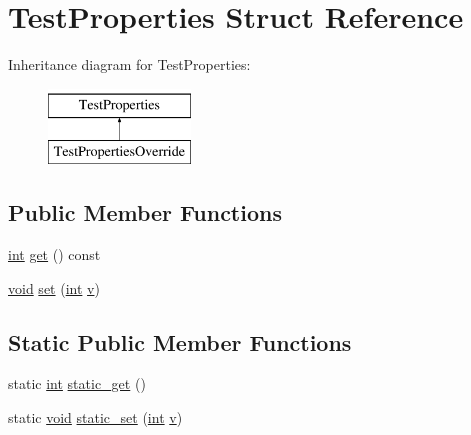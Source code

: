\hypertarget{struct_test_properties}{}\section{Test\+Properties Struct Reference}
\label{struct_test_properties}
Inheritance diagram for Test\+Properties\+:\begin{figure}[H]
\begin{center}
\leavevmode
\includegraphics[height=2.000000cm]{struct_test_properties}
\end{center}
\end{figure}
\subsection*{Public Member Functions}
\begin{DoxyCompactItemize}
\item 
\mbox{\hyperlink{warnings_8h_a74f207b5aa4ba51c3a2ad59b219a423b}{int}} \mbox{\hyperlink{struct_test_properties_aacc5c9e0b4d5e4d09e9fefcf07c36db9}{get}} () const
\item 
\mbox{\hyperlink{_s_d_l__opengles2__gl2ext_8h_ae5d8fa23ad07c48bb609509eae494c95}{void}} \mbox{\hyperlink{struct_test_properties_aa66f155053588d2822554fd52e55408f}{set}} (\mbox{\hyperlink{warnings_8h_a74f207b5aa4ba51c3a2ad59b219a423b}{int}} \mbox{\hyperlink{_s_d_l__opengl_8h_a10a82eabcb59d2fcd74acee063775f90}{v}})
\end{DoxyCompactItemize}
\subsection*{Static Public Member Functions}
\begin{DoxyCompactItemize}
\item 
static \mbox{\hyperlink{warnings_8h_a74f207b5aa4ba51c3a2ad59b219a423b}{int}} \mbox{\hyperlink{struct_test_properties_a2704165e145e02a8f4df12deae7ec347}{static\+\_\+get}} ()
\item 
static \mbox{\hyperlink{_s_d_l__opengles2__gl2ext_8h_ae5d8fa23ad07c48bb609509eae494c95}{void}} \mbox{\hyperlink{struct_test_properties_a023fbce09cdfc80a93493a52d295ad81}{static\+\_\+set}} (\mbox{\hyperlink{warnings_8h_a74f207b5aa4ba51c3a2ad59b219a423b}{int}} \mbox{\hyperlink{_s_d_l__opengl_8h_a10a82eabcb59d2fcd74acee063775f90}{v}})
\end{DoxyCompactItemize}
